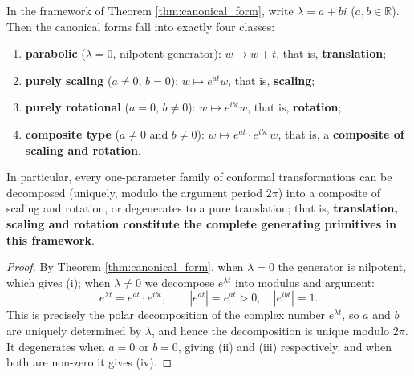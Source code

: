 \begin{corollary}\label{cor:three_transformations_complete}
In the framework of Theorem \ref{thm:canonical_form}, write $\lambda=a+bi$ ($a,b\in\mathbb R$). Then the canonical forms fall into exactly four classes:
\begin{enumerate}[label=(\roman*)]
    \item \textbf{parabolic} ($\lambda=0$, nilpotent generator): $w\mapsto w+t$, that is, \textbf{translation};
    \item \textbf{purely scaling} ($a\neq0$, $b=0$): $w\mapsto e^{at}w$, that is, \textbf{scaling};
    \item \textbf{purely rotational} ($a=0$, $b\neq0$): $w\mapsto e^{ibt}w$, that is, \textbf{rotation};
    \item \textbf{composite type} ($a\neq0$ and $b\neq0$): $w\mapsto e^{at}\cdot e^{ibt}\,w$, that is, a \textbf{composite of scaling and rotation}.
\end{enumerate}
In particular, every one-parameter family of conformal transformations can be decomposed (uniquely, modulo the argument period $2\pi$) into a composite of scaling and rotation, or degenerates to a pure translation; that is, \textbf{translation, scaling and rotation constitute the complete generating primitives in this framework}.
\end{corollary}

\begin{proof}
By Theorem \ref{thm:canonical_form}, when $\lambda=0$ the generator is nilpotent, which gives (i); when $\lambda\neq0$ we decompose $e^{\lambda t}$ into modulus and argument:
\[
e^{\lambda t}=e^{at}\cdot e^{ibt},\qquad |e^{at}|=e^{at}>0,\quad |e^{ibt}|=1 .
\]
This is precisely the polar decomposition of the complex number $e^{\lambda t}$, so $a$ and $b$ are uniquely determined by $\lambda$, and hence the decomposition is unique modulo $2\pi$. It degenerates when $a=0$ or $b=0$, giving (ii) and (iii) respectively, and when both are non-zero it gives (iv).
\end{proof}

